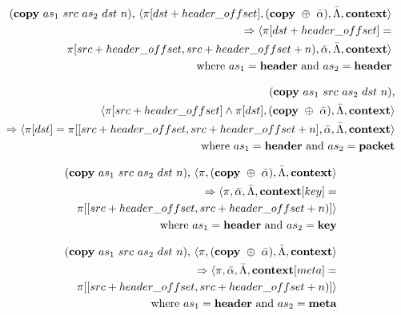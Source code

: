 \documentclass{article}
\begin{document}
\begin{equation}
\begin{split}
  (\textrm{\textbf{copy}} \ as_1 \ src \ as_2 \ dst \ n)
  \textrm{,} \ \langle \pi[dst + header\_offset], (\textrm{\textbf{copy}} \ \oplus \ \bar \alpha), \bar \Lambda, \textrm{\textbf{context}} \rangle \\
  \Rightarrow
  \langle \pi[dst + header\_offset] = \\ \pi[src + header\_offset, src + header\_offset + n),
  \bar \alpha, \bar \Lambda, \textrm{\textbf{context}} \rangle \\
    \textrm{where} \ as_1 = \textrm{\textbf{header} and } as_2 =
    \textrm{\textbf{header}}
\end{split}
\end{equation}

\begin{equation}
\begin{split}
  (\textrm{\textbf{copy}} \ as_1 \ src \ as_2 \ dst \ n)
  \textrm{,} \\ \langle \pi[src + header\_offset] \wedge \pi[dst], (\textrm{\textbf{copy}} \ \oplus \ \bar \alpha), \bar \Lambda, \textrm{\textbf{context}} \rangle \\  
  \Rightarrow
  \langle \pi[dst] = \pi[[src + header\_offset, src + header\_offset + n], \bar \alpha, \bar \Lambda, \textrm{\textbf{context}} \rangle \\  
    \textrm{where} \ as_1 = \textrm{\textbf{header} and } as_2 =
    \textrm{\textbf{packet}}
\end{split}
\end{equation}

\begin{equation}
\begin{split}
  (\textrm{\textbf{copy}} \ as_1 \ src \ as_2 \ dst \ n)
  \textrm{,} \ \langle \pi, (\textrm{\textbf{copy}} \ \oplus \ \bar \alpha), \bar \Lambda, \textrm{\textbf{context}} \rangle \\
  \Rightarrow
  \langle \pi, \bar \alpha, \bar \Lambda, \textrm{\textbf{context}}[key] = \\\pi[[src + header\_offset, src + header\_offset + n)] \rangle \\
    \textrm{where} \ as_1 = \textrm{\textbf{header} and } as_2 =
    \textrm{\textbf{key}}
\end{split}
\end{equation}

\begin{equation}
\begin{split}
  (\textrm{\textbf{copy}} \ as_1 \ src \ as_2 \ dst \ n)
  \textrm{,} \ \langle \pi, (\textrm{\textbf{copy}} \ \oplus \ \bar \alpha), \bar \Lambda, \textrm{\textbf{context}} \rangle \\
  \Rightarrow
  \langle \pi, \bar \alpha, \bar \Lambda, \textrm{\textbf{context}}[meta] = \\ \pi[[src + header\_offset, src + header\_offset + n)] \rangle \\
    \textrm{where} \ as_1 = \textrm{\textbf{header} and } as_2 =
    \textrm{\textbf{meta}}
\end{split}
\end{equation}
\end{document}
